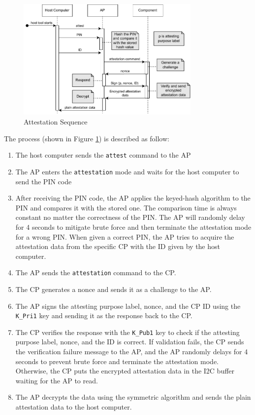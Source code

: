 \documentclass[11pt,oneside,onecolumn,letterpaper]{article}
\newcounter{alg}
\begin{document}
	\begin{figure}[h]
		\centering
		\includegraphics[width=0.8\textwidth]{pics/attest.pdf}
		\caption{Attestation Sequence}
		\label{fig:functionality_attest}
	\end{figure}
	
	The process (shown in Figure \ref{fig:functionality_attest}) is described as follow:
	\begin{enumerate}
		\item The host computer sends the \texttt{attest} command to the AP
		\item The AP enters the \texttt{attestation} mode and waits for the host computer to send the PIN code
		\item After receiving the PIN code,
		the AP applies the keyed-hash algorithm to the PIN and compares it with the stored one.
		The comparison time is always constant no matter the correctness of the PIN.
		The AP will randomly delay for 4 seconds to mitigate brute force and then terminate the attestation mode for a wrong PIN.
		When given a correct PIN,
		the AP tries to acquire the attestation data from the specific CP with the ID given by the host computer.
		\item The AP sends the \texttt{attestation} command to the CP.
		\item The CP generates a nonce and sends it as a challenge to the AP.
		\item The AP signs the attesting purpose label,
		nonce,
		and the CP ID using the \texttt{K\_Pri1} key and sending it as the response back to the CP.
		\item The CP verifies the response with the \texttt{K\_Pub1} key to check if the attesting purpose label,
		nonce,
		and the ID is correct.
		If validation fails,
		the CP sends the verification failure message to the AP,
		and the AP randomly delays for 4 seconds to prevent brute force and terminate the attestation mode.
		Otherwise,
		the CP puts the encrypted attestation data in the I2C buffer waiting for the AP to read.
		\item The AP decrypts the data using the symmetric algorithm and sends the plain attestation data to the host computer.
	\end{enumerate}
	
\end{document}
